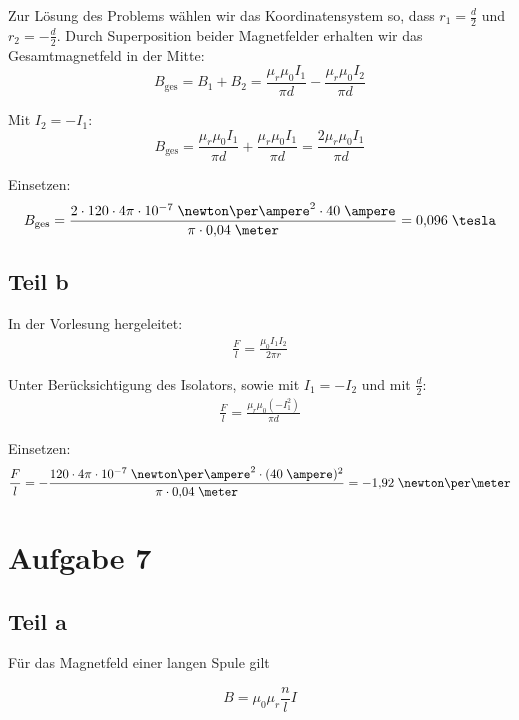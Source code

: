 \documentclass[a4paper,german,12pt,smallheadings]{scrartcl}
\begin{document}
Zur Lösung des Problems wählen wir das Koordinatensystem so, dass
$r_1=\frac{d}{2}$ und $r_2=-\frac{d}{2}$. Durch Superposition beider
Magnetfelder erhalten wir das Gesamtmagnetfeld in der Mitte:
\begin{equation*}
B_{\text{ges}}=B_1+B_2= \frac{\mu_r \mu_0 I_1}{\pi d}- \frac{\mu_r \mu_0 I_2}{\pi d}
\end{equation*}

Mit $I_2=-I_1$:
\begin{equation*}
B_{\text{ges}}=\frac{\mu_r \mu_0 I_1}{\pi d}+ \frac{\mu_r \mu_0 I_1}{\pi d}=\frac{2\mu_r \mu_0 I_1}{\pi d}
\end{equation*}

Einsetzen:
\begin{equation*}
B_{\text{ges}}=\frac{2\cdot 120 \cdot 4\pi \cdot 10^{-7} \;\newton\per\ampere^2 \cdot 40 \;\ampere}{\pi \cdot 0{,}04 \;\meter} = 0{,}096 \;\tesla
\end{equation*}

\subsection*{Teil b}

In der Vorlesung hergeleitet:
\begin{align*}
\frac{F}{l}=\frac{\mu_0 I_1 I_2}{2 \pi r}
\end{align*}

Unter Berücksichtigung des Isolators, sowie mit $I_1=-I_2$ und  mit $\frac{d}{2}$:
\begin{align*}
\frac{F}{l}=\frac{\mu_r \mu_0 (-I_1^2)}{\pi d}
\end{align*}

Einsetzen:
\begin{align*}
\frac{F}{l}=-\frac{120 \cdot 4\pi \cdot 10^{-7} \;\newton\per\ampere^2 \cdot (40 \;\ampere)^2}{\pi \cdot 0{,}04 \;\meter} = -1{,}92 \;\newton\per\meter
\end{align*}

\section*{Aufgabe 7}
\subsection*{Teil a}
Für das Magnetfeld einer langen Spule gilt

\begin{equation}
  B = \mu_0 \mu_r \frac{n}{l} I
\end{equation}
\end{document}
